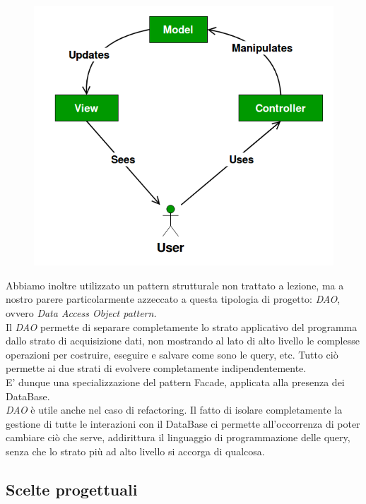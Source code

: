 \documentclass[a4paper,12pt,titlepage]{article}
\begin{document}
\begin{figure}[H]
		\centering
		\includegraphics[scale=0.45]{MVC}
\end{figure}

Abbiamo inoltre utilizzato un pattern strutturale non trattato a lezione, ma a nostro parere particolarmente azzeccato a questa tipologia di progetto: \textit{DAO}, ovvero \textit{Data Access Object pattern.}\\
Il \textit{DAO} permette di separare completamente lo strato applicativo del programma dallo strato di acquisizione dati, non mostrando al lato di alto livello le complesse operazioni per costruire, eseguire e salvare come sono le query, etc. Tutto ciò permette ai due strati di evolvere completamente indipendentemente.\\
E' dunque una specializzazione del pattern Facade, applicata alla presenza dei DataBase.\\
\textit{DAO} è utile anche nel caso di refactoring. Il fatto di isolare completamente la gestione di tutte le interazioni con il DataBase ci permette all'occorrenza di poter cambiare ciò che serve, addirittura il linguaggio di programmazione delle query, senza che lo strato più ad alto livello si accorga di qualcosa.\\


\subsection{Scelte progettuali}\label{sec:scelte progettuali}
\end{document}
